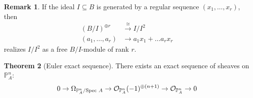 \documentclass[10pt,reqno]{amsart}
\theoremstyle{definition}
\newtheorem{theorem}{Theorem}
\newtheorem{remark}[theorem]{Remark}
\theoremstyle{remark}
\numberwithin{equation}{section}
\numberwithin{theorem}{section}
\newcommand{\OO}{{\mathcal O}}
\newcommand{\spec}{\textup{Spec }}
\newcommand{\PP}{{\mathbb P}}
\begin{document}
\begin{remark}
If the ideal $I \subseteq B$ is generated by a regular sequence $(x_1,\dots,x_r)$, then 
\begin{align*}
(B/I)^{\oplus r} & \stackrel{\cong}{\to} I/I^2\\
(a_1,\dots,a_r) & \to a_1x_1 + \dots a_rx_r
\end{align*}
realizes $I/I^2$ as a free $B/I$-module of rank $r$.
\end{remark}

\begin{theorem}[Euler exact sequence] There exists an exact sequence of sheaves on $\PP^n_A$:
\begin{align*}
0 \to \Omega_{\PP^n_A/\spec A} \to \OO_{\PP^n_A}(-1)^{\oplus (n+1)} \to \OO_{\PP^n_A} \to 0
\end{align*}
\end{theorem}
\end{document}
